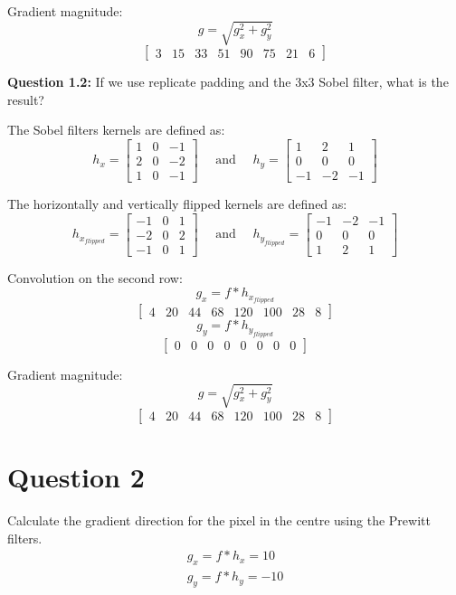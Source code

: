 \documentclass[12pt]{article}
\begin{document}
Gradient magnitude:
$$
    g = \sqrt{g_x^2 + g_y^2}
$$
$$
\begin{bmatrix}
    3 & 15 & 33 & 51 & 90 & 75 & 21 & 6
\end{bmatrix}
$$

\textbf{Question 1.2:} If we use replicate padding and the 3x3 Sobel filter, what is the result? 

The Sobel filters kernels are defined as:
$$
 h_{x} = \begin{bmatrix}
     1 & 0 & -1 \\
     2 & 0 & -2 \\
     1 & 0 & -1
 \end{bmatrix} \quad \text{ and } \quad h_{y} = \begin{bmatrix}
    1 & 2 & 1 \\
    0 & 0 & 0 \\
    -1 & -2 & -1
\end{bmatrix} 
$$

The horizontally and vertically flipped kernels are defined as:
$$
 h_{x_{flipped}} = \begin{bmatrix}
     -1 & 0 & 1 \\
     -2 & 0 & 2 \\
     -1 & 0 & 1
 \end{bmatrix} \quad \text{ and } \quad h_{y_{flipped}} = \begin{bmatrix}
    -1 & -2 & -1 \\
    0 & 0 & 0 \\
    1 & 2 & 1
\end{bmatrix} 
$$

Convolution on the second row:
$$
    g_x = f * h_{x_{flipped}} 
$$
$$
\begin{bmatrix}
    4 & 20 & 44 & 68 & 120 & 100 & 28 & 8
\end{bmatrix}
$$
$$
    g_y = f * h_{y_{flipped}}
$$
$$
\begin{bmatrix}
    0 & 0 & 0 & 0 & 0 & 0 & 0 & 0
\end{bmatrix}
$$

Gradient magnitude:
$$
    g = \sqrt{g_x^2 + g_y^2}
$$
$$
\begin{bmatrix}
    4 & 20 & 44 & 68 & 120 & 100 & 28 & 8
\end{bmatrix}
$$

\section*{Question 2}

Calculate the gradient direction for the pixel in the centre using the Prewitt filters.
\begin{gather*}
    g_x = f * h_x = 10 \\ 
    g_y = f * h_y = -10
\end{gather*}
\end{document}
